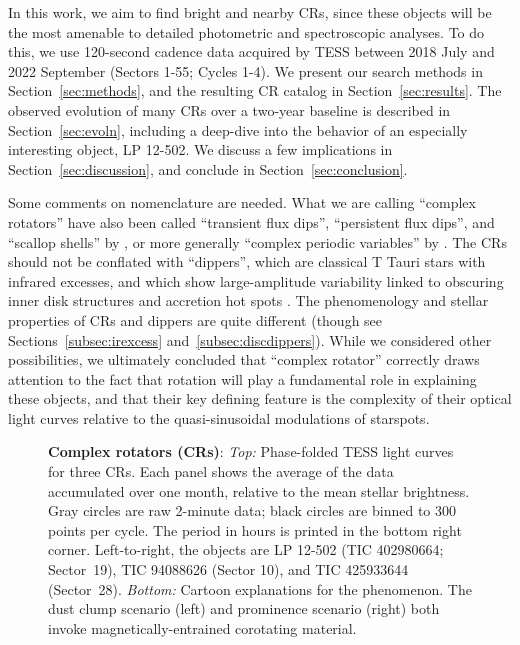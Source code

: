 \documentclass[11pt,twocolumn,tighten]{aastex63}
\begin{document}
In this work, we aim to find bright and nearby CRs, since these
objects will be the most amenable to detailed photometric and
spectroscopic analyses.  To do this, we use 120-second cadence data
acquired by TESS between 2018 July and 2022 September (Sectors 1-55;
Cycles 1-4).  We present our search methods in
Section~\ref{sec:methods}, and the resulting CR catalog in
Section~\ref{sec:results}.  The observed evolution of many CRs over a
two-year baseline is described in Section~\ref{sec:evoln}, including a
deep-dive into the behavior of an especially interesting object, LP
12-502.  We discuss a few implications in
Section~\ref{sec:discussion}, and conclude in
Section~\ref{sec:conclusion}.

Some comments on nomenclature are needed.  What we are calling
``complex rotators''
\citep{2019ApJ...876..127Z,2022AJ....163..144G,2023ApJ...945..114P}
have also been called ``transient flux dips'', ``persistent flux
dips'', and ``scallop shells'' by \citet{2017AJ....153..152S}, or more
generally ``complex periodic variables'' by
\citet{2023MNRAS.518.2921K}.  The CRs should not be conflated with
``dippers'', which are classical T Tauri stars with infrared excesses,
and which show large-amplitude variability linked to obscuring inner
disk structures and accretion hot spots
\citep{2014AJ....147...82C,2021ApJ...908...16R}.  The phenomenology
and stellar properties of CRs and dippers are quite different (though
see Sections~\ref{subsec:irexcess} and~\ref{subsec:discdippers}).
While we considered other possibilities, we ultimately concluded that
``complex rotator'' correctly draws attention to the fact that
rotation will play a fundamental role in explaining these objects, and
that their key defining feature is the complexity of their optical
light curves relative to the quasi-sinusoidal modulations of
starspots.


\begin{figure*}[!t]
	\begin{center}
		
		\vspace{-0.65cm}
	\end{center}
		\vspace{-0.5cm}
	\caption{
		{\bf Complex rotators (CRs)}:
    {\it Top:} Phase-folded TESS light curves for three CRs.  Each
    panel shows the average of the data accumulated over one month,
    relative to the mean stellar brightness.
    Gray circles are raw 2-minute data; black circles are binned to
    300 points per cycle.  The period in hours is printed in the
    bottom right corner.  Left-to-right, the objects are LP 12-502
    (TIC 402980664; Sector~19), TIC 94088626 (Sector 10), and TIC
    425933644 (Sector~28).
    {\it Bottom:} Cartoon explanations for the phenomenon.  The dust
    clump scenario (left) and prominence scenario (right) both invoke
    magnetically-entrained corotating material.
	}
	\label{fig:f1}
\end{figure*}
\end{document}
